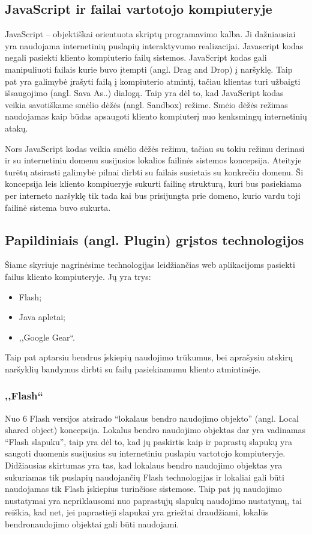 \documentclass[12pt,a4paper,titlepage]{article}
\begin{document}
\subsection{JavaScript ir failai vartotojo kompiuteryje}

JavaScript – objektiškai orientuota skriptų programavimo kalba. Ji dažniausiai yra naudojama internetinių puslapių interaktyvumo realizacijai. Javascript kodas negali pasiekti kliento kompiuterio failų sistemos. JavaScript kodas gali manipuliuoti failais kurie buvo įtempti (angl. Drag and Drop) į naršyklę. Taip pat yra galimybė įrašyti failą į kompiuterio atmintį, tačiau klientas turi užbaigti išsaugojimo (angl. Sava As..) dialogą. Taip yra dėl to, kad JavaScript kodas veikia savotiškame smėlio dėžės (angl. Sandbox) režime. Smėio dėžės režimas naudojamas kaip būdas apsaugoti kliento kompiuterį nuo kenksmingų internetinių atakų.

Nors JavaScript kodas veikia smėlio dėžės režimu, tačiau su tokiu režimu derinasi ir su internetiniu domenu susijusios lokalios failinės sistemos koncepsija. Ateityje turėtų atsirasti galimybė pilnai dirbti su failais susietais su konkrečiu domenu. Ši koncepsija leis kliento kompiueryje sukurti failinę strukturą, kuri bus pasiekiama per interneto naršyklę tik tada kai bus prisijungta prie domeno, kurio vardu toji failinė sistema buvo sukurta.

\subsection{Papildiniais (angl. Plugin) grįstos technologijos}

Šiame skyriuje nagrinėsime technologijas leidžiančias web aplikacijoms pasiekti failus kliento kompiuteryje. Jų yra trys:
\begin{itemize}
  \item Flash;
  \item Java apletai;
  \item ,,Google Gear``.
\end{itemize}

Taip pat aptarsiu bendrus įskiepių naudojimo trūkumus, bei aprašysiu atskirų naršyklių bandymus dirbti su failų pasiekiamumu kliento atmintinėje.

\subsubsection{,,Flash``}

Nuo 6 Flash versijos atsirado “lokalaus bendro naudojimo objekto” (angl. Local shared object) koncepsija. Lokalus bendro naudojimo objektas dar yra vadinamas “Flash slapuku”, taip yra dėl to, kad jų paskirtis kaip ir paprastų slapukų yra saugoti duomenis susijusius su internetiniu puslapiu vartotojo kompiuteryje. Didžiausias skirtumas yra tas, kad lokalaus bendro naudojimo objektas yra sukuriamas tik puslapių naudojančių Flash technologijas ir lokaliai gali būti naudojamas tik Flash įskiepius turinčiose sistemose. Taip pat jų naudojimo nustatymai yra nepriklausomi nuo paprastųjų slapukų naudojimo nustatymų, tai reiškia, kad net, jei paprastieji slapukai yra griežtai draudžiami, lokalūs bendronaudojimo objektai gali būti naudojami. 
\end{document}
